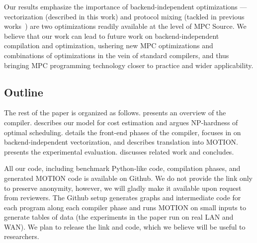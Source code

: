 Our results emphasize the importance of backend-independent optimizations --- vectorization (described in this work) and protocol mixing (tackled in previous works~\cite{Buscher:2018b,Ishaq:2019, Fang:2022}) are two optimizations readily available at the level of MPC Source. We believe that our work can lead to future work on backend-independent compilation and optimization, ushering new MPC optimizations and combinations of optimizations in the vein of standard compilers, and thus bringing MPC programming technology closer to practice and wider applicability.

\subsection{Outline}

The rest of the paper is organized as follows.  presents an overview of the compiler.  describes our model for cost estimation and argues NP-hardness of optimal scheduling.  details the front-end phases of the compiler,  focuses in on backend-independent vectorization, and  describes translation into MOTION.  presents the experimental evaluation. discusses related work and  concludes.

All our code, including benchmark Python-like code, compilation phases, and generated MOTION code is available on Github. We do not provide the link only to preserve anonymity, 
however, we will gladly make it available upon request from reviewers. The Github setup generates graphs and intermediate code for each program along each compiler phase and runs MOTION on 
small inputs to generate tables of data (the experiments in the paper run on real LAN and WAN). We plan to release the link and code, which we believe will be useful to researchers.

